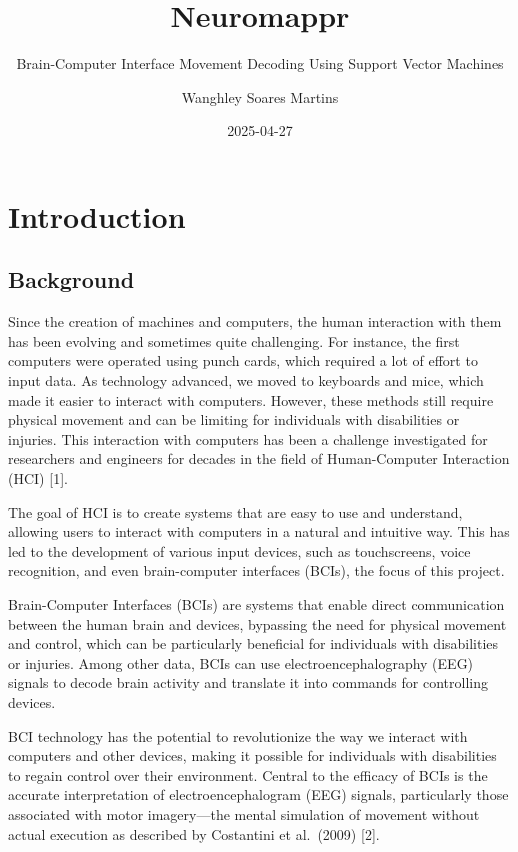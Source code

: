 \documentclass[
  letterpaper,
  DIV=11,
  numbers=noendperiod]{scrartcl}
\title{Neuromappr}
\subtitle{Brain-Computer Interface Movement Decoding Using Support
Vector Machines}
\author{Wanghley Soares Martins}
\date{2025-04-27}
\renewcommand*\contentsname{Table of contents}
\newcommand\contentsname{Table of contents}
\begin{document}
\maketitle

\renewcommand*\contentsname{Table of contents}
{
\hypersetup{linkcolor=}
\setcounter{tocdepth}{2}
\tableofcontents
}

\section{Introduction}\label{introduction}

\subsection{Background}\label{background}

Since the creation of machines and computers, the human interaction with
them has been evolving and sometimes quite challenging. For instance,
the first computers were operated using punch cards, which required a
lot of effort to input data. As technology advanced, we moved to
keyboards and mice, which made it easier to interact with computers.
However, these methods still require physical movement and can be
limiting for individuals with disabilities or injuries. This interaction
with computers has been a challenge investigated for researchers and
engineers for decades in the field of Human-Computer Interaction (HCI)
{[}1{]}.

The goal of HCI is to create systems that are easy to use and
understand, allowing users to interact with computers in a natural and
intuitive way. This has led to the development of various input devices,
such as touchscreens, voice recognition, and even brain-computer
interfaces (BCIs), the focus of this project.

Brain-Computer Interfaces (BCIs) are systems that enable direct
communication between the human brain and devices, bypassing the need
for physical movement and control, which can be particularly beneficial
for individuals with disabilities or injuries. Among other data, BCIs
can use electroencephalography (EEG) signals to decode brain activity
and translate it into commands for controlling devices.

BCI technology has the potential to revolutionize the way we interact
with computers and other devices, making it possible for individuals
with disabilities to regain control over their environment. Central to
the efficacy of BCIs is the accurate interpretation of
electroencephalogram (EEG) signals, particularly those associated with
motor imagery---the mental simulation of movement without actual
execution as described by Costantini et al.~(2009) {[}2{]}.
\end{document}
